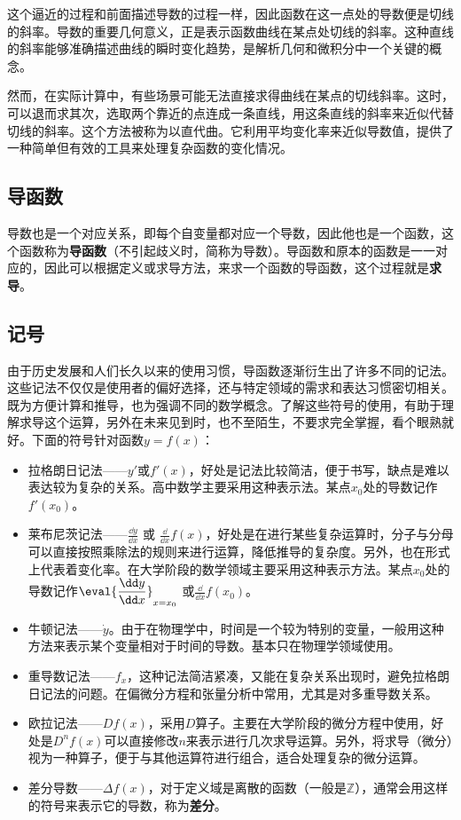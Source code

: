 这个逼近的过程和前面描述导数的过程一样，因此函数在这一点处的导数便是切线的斜率。导数的重要几何意义，正是表示函数曲线在某点处切线的斜率。这种直线的斜率能够准确描述曲线的瞬时变化趋势，是解析几何和微积分中一个关键的概念。

然而，在实际计算中，有些场景可能无法直接求得曲线在某点的切线斜率。这时，可以退而求其次，选取两个靠近的点连成一条直线，用这条直线的斜率来近似代替切线的斜率。这个方法被称为以直代曲。它利用平均变化率来近似导数值，提供了一种简单但有效的工具来处理复杂函数的变化情况。


\subsection{导函数}

导数也是一个对应关系，即每个自变量都对应一个导数，因此他也是一个函数，这个函数称为\textbf{导函数}（不引起歧义时，简称为导数）。导函数和原本的函数是一一对应的，因此可以根据定义或求导方法，来求一个函数的导函数，这个过程就是\textbf{求导}。

\subsection{记号}

由于历史发展和人们长久以来的使用习惯，导函数逐渐衍生出了许多不同的记法。这些记法不仅仅是使用者的偏好选择，还与特定领域的需求和表达习惯密切相关。既为方便计算和推导，也为强调不同的数学概念。了解这些符号的使用，有助于理解求导这个运算，另外在未来见到时，也不至陌生，不要求完全掌握，看个眼熟就好。下面的符号针对函数$y=f(x)$：
\begin{itemize}
\item 拉格朗日记法——$y'$或$f'(x)$，好处是记法比较简洁，便于书写，缺点是难以表达较为复杂的关系。高中数学主要采用这种表示法。某点$x_0$处的导数记作$f'(x_0)$。
\item 莱布尼茨记法——$\displaystyle\frac{\dd y}{\dd x}$  或  $\displaystyle\frac{\dd}{\dd x}f(x)$，好处是在进行某些复杂运算时，分子与分母可以直接按照乘除法的规则来进行运算，降低推导的复杂度。另外，也在形式上代表着变化率。在大学阶段的数学领域主要采用这种表示方法。某点$x_0$处的导数记作$\displaystyle\eval{\dfrac{\dd y}{\dd x}}_{x=x_0}$ 或$\displaystyle\frac{\dd}{\dd x}f(x_0)$。
\item 牛顿记法——$\dot{y}$。由于在物理学中，时间是一个较为特别的变量，一般用这种方法来表示某个变量相对于时间的导数。基本只在物理学领域使用。
\item 重导数记法——$f_x$，这种记法简洁紧凑，又能在复杂关系出现时，避免拉格朗日记法的问题。在偏微分方程和张量分析中常用，尤其是对多重导数关系。
\item 欧拉记法——$Df(x)$，采用$D$算子。主要在大学阶段的微分方程中使用，好处是$D^n f(x)$可以直接修改$n$来表示进行几次求导运算。另外，将求导（微分）视为一种算子，便于与其他运算符进行组合，适合处理复杂的微分运算。
\item 差分导数——$\Delta f(x)$，对于定义域是离散的函数（一般是$\mathbb{Z}$），通常会用这样的符号来表示它的导数，称为\textbf{差分}。
\end{itemize}

